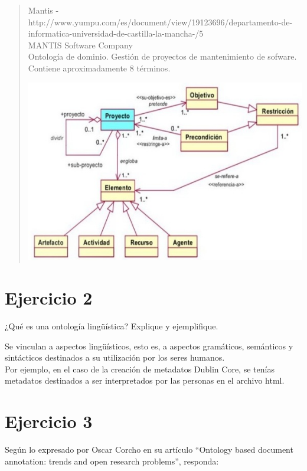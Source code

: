 \documentclass[a4paper,12pt,oneside,final,spanish]{article}
\begin{document}
\begin{quote}
Mantis - http://www.yumpu.com/es/document/view/19123696/departamento-de-informatica-universidad-de-castilla-la-mancha-/5\\
MANTIS Software Company\\
Ontología de dominio. Gestión de proyectos de mantenimiento de sofware. Contiene aproximadamente 8 términos.

\begin{center}
\includegraphics[width=0.7\linewidth,keepaspectratio]{ont4.jpg}
\end{center}

\end{quote}

\section*{Ejercicio 2}

¿Qué es una ontología lingüística? Explique y ejemplifique. 

\dotfill

Se vinculan a aspectos lingüísticos, esto es, a aspectos gramáticos, semánticos y sintácticos destinados a su utilización por los seres humanos.\\
Por ejemplo, en el caso de la creación de metadatos Dublin Core, se tenías metadatos destinados a ser interpretados por las personas en el archivo html.

\section*{Ejercicio 3}

Según lo expresado por Oscar Corcho en su artículo “Ontology  based 
document annotation: trends and open research problems”, responda: 
\end{document}

